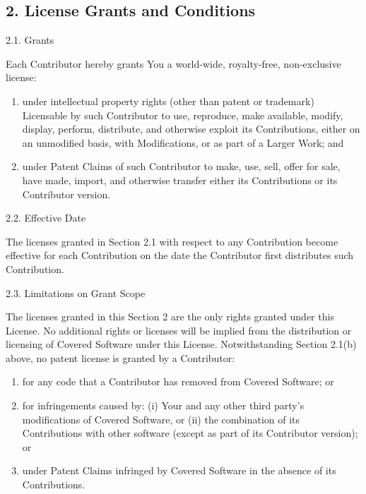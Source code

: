 \documentclass[letterpaper,10pt,english]{sphinxmanual}
\begin{document}
\subsection{2. License Grants and Conditions}
\label{\detokenize{warranty:license-grants-and-conditions}}
2.1. Grants

Each Contributor hereby grants You a world-wide, royalty-free,
non-exclusive license:
\begin{enumerate}
\item {} 
under intellectual property rights (other than patent or trademark)
Licensable by such Contributor to use, reproduce, make available,
modify, display, perform, distribute, and otherwise exploit its
Contributions, either on an unmodified basis, with Modifications, or
as part of a Larger Work; and

\item {} 
under Patent Claims of such Contributor to make, use, sell, offer
for sale, have made, import, and otherwise transfer either its
Contributions or its Contributor version.

\end{enumerate}

2.2. Effective Date

The licenses granted in Section 2.1 with respect to any Contribution
become effective for each Contribution on the date the Contributor first
distributes such Contribution.

2.3. Limitations on Grant Scope

The licenses granted in this Section 2 are the only rights granted under
this License. No additional rights or licenses will be implied from the
distribution or licensing of Covered Software under this License.
Notwithstanding Section 2.1(b) above, no patent license is granted by a
Contributor:
\begin{enumerate}
\item {} 
for any code that a Contributor has removed from Covered Software;
or

\item {} 
for infringements caused by: (i) Your and any other third party’s
modifications of Covered Software, or (ii) the combination of its
Contributions with other software (except as part of its Contributor
version); or

\item {} 
under Patent Claims infringed by Covered Software in the absence of
its Contributions.

\end{enumerate}
\end{document}
